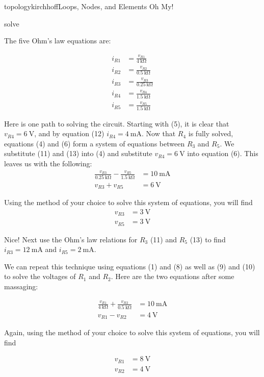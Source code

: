 \begin{mainquestion}{topologykirchhoff}{Loops, Nodes, and Elements Oh My!}
\begin{partquestion}{solve}
\begin{answer}
The five Ohm's law equations are:

\begin{align}
i_{R1} &= \frac{v_{R1}}{\qty{4}{\kilo\ohm}} \\
i_{R2} &= \frac{v_{R2}}{\qty{0.5}{\kilo\ohm}} \\
i_{R3} &= \frac{v_{R3}}{\qty{0.25}{\kilo\ohm}} \\
i_{R4} &= \frac{v_{R4}}{\qty{1.5}{\kilo\ohm}} \\
i_{R5} &= \frac{v_{R5}}{\qty{1.5}{\kilo\ohm}}
\end{align}

Here is one path to solving the circuit. Starting with (5), it is clear that
$v_{R4}=\qty{6}{\volt}$, and by equation (12)
$i_{R4}=\qty{4}{\milli\ampere}$. Now that $R_4$ is fully solved, equations (4) and (6) form a system of equations between $R_3$ and $R_5$. We substitute (11) and (13) into (4) and substitute $v_{R4}=\qty{6}{\volt}$ into equation (6). This leaves us with the following:
\begin{align*}
\frac{v_{R3}}{\qty{0.25}{\kilo\ohm}}
-
\frac{v_{R5}}{\qty{1.5}{\kilo\ohm}}
&=
\qty{10}{\milli\ampere} \\
v_{R3}+v_{R5}
&=
\qty{6}{\volt}
\end{align*}

Using the method of your choice to solve this system of equations, you will find
\begin{align*}
v_{R3} &= \qty{3}{\volt} \\
v_{R5} &= \qty{3}{\volt}
\end{align*}

Nice! Next use the Ohm's law relations for $R_3$ (11) and $R_5$ (13) to find
$i_{R3}=\qty{12}{\milli\ampere}$ and
$i_{R5}=\qty{2}{\milli\ampere}$.

We can repeat this technique using equations (1) and (8) as well as (9) and (10) to solve the voltages of $R_1$ and $R_2$. Here are the two equations after some massaging:

\begin{align*}
\frac{v_{R1}}{\qty{4}{\kilo\ohm}}
+
\frac{v_{R2}}{\qty{0.5}{\kilo\ohm}}
&=
\qty{10}{\milli\ampere} \\
v_{R1}-v_{R2}
&=
\qty{4}{\volt}
\end{align*}

Again, using the method of your choice to solve this system of equations, you will find

\begin{align*}
v_{R1} &= \qty{8}{\volt} \\
v_{R2} &= \qty{4}{\volt}
\end{align*}


\end{answer}
\end{partquestion}
\end{mainquestion}
